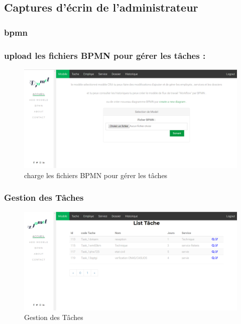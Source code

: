  \subsection{Captures d'écrin de l'administrateur }
 
 \subsubsection{bpmn }
 
  \subsubsection{upload les fichiers BPMN pour gérer les tâches  : }
  
 
\begin{figure}[H]
	\centering
	\includegraphics[width=1\linewidth]{images/captures/capturesadmin/bpmnuplod}
	\caption{charge les fichiers BPMN pour gérer les tâches }
	\label{fig:bpmnuplod}
\end{figure}
 
 
 
 
 \subsubsection{Gestion des Tâches }
\begin{figure}[H]
	\centering
	\includegraphics[width=1\linewidth]{images/captures/capturesadmin/tache}
	\caption{Gestion des Tâches}
	\label{fig:tache}
\end{figure}

